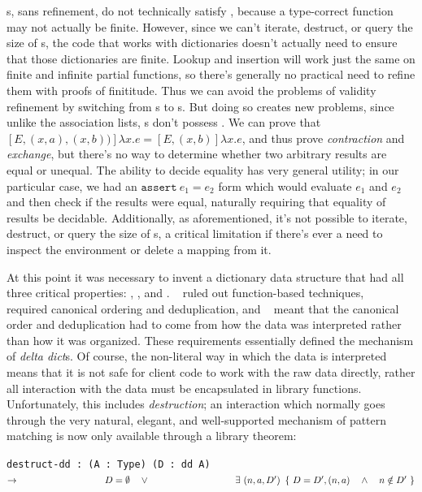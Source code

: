 \documentclass[nonacm]{acmart}
\newcommand{\dd}{\emph{delta dict}}
\theoremstyle{slplain}
\numberwithin{thm}{section}
\begin{document}
{\FPF}s, sans refinement, do not technically satisfy \SemTot, because a type-correct function may not
actually be finite. However, since we can't iterate, destruct, or query the size of {\FPF}s, the code
that works with dictionaries doesn't actually need to ensure that those dictionaries are finite. Lookup
and insertion will work just the same on finite and infinite partial functions, so there's generally no
practical need to refine them with proofs of finititude. Thus we can avoid the problems of validity refinement
by switching from {\CAL}s to {\FPF}s. But doing so creates new problems, since unlike the association lists,
{\FPF}s don't possess \EqDec. We can prove that
\mbox{$[E, (x, a), (x, b))]\lambda x . e = [E, (x, b)]\lambda x . e$}, and thus prove \emph{contraction} and
\emph{exchange}, but there's no way to determine whether two arbitrary results are equal or unequal.
The ability to decide equality has very general utility; in our particular case, we had an
\mbox{$\texttt{assert}~ e_1 = e_2$} form which would evaluate $e_1$ and $e_2$ and then check if the results
were equal, naturally requiring that equality of results be decidable. Additionally, as aforementioned,
it's not possible to iterate, destruct, or query the size of {\FPF}s, a critical limitation if there's
ever a need to inspect the environment or delete a mapping from it.

At this point it was necessary to invent a dictionary data structure that had all three critical properties:
\SemTot, \SemInj, and \EqDec. \EqDec~ ruled out function-based techniques, \SemInj~ required canonical
ordering and deduplication, and \SemTot~ meant that the canonical order and deduplication had to come from
how the data was interpreted rather than how it was organized. These requirements essentially defined the
mechanism of {\dd}s. Of course, the non-literal way in which the data is interpreted means that it is not
safe for client code to work with the raw data directly, rather all interaction with the data must be
encapsulated in library functions. Unfortunately, this includes \emph{destruction}; an interaction which
normally goes through the very natural, elegant, and well-supported mechanism of pattern matching is now
only available through a library theorem:

\texttt{destruct-dd : (A : Type) (D : dd A) $\rightarrow \\
\phantom{xxxxxxxxxxxxxxxx} D = \emptyset \quad \lor \\
\phantom{xxxxxxxxxxxxxxxx} \exists~(n, a, D')~\left\{~ D = D' , (n, a) \quad \land \quad n \notin D' ~\right\}$}
\end{document}
